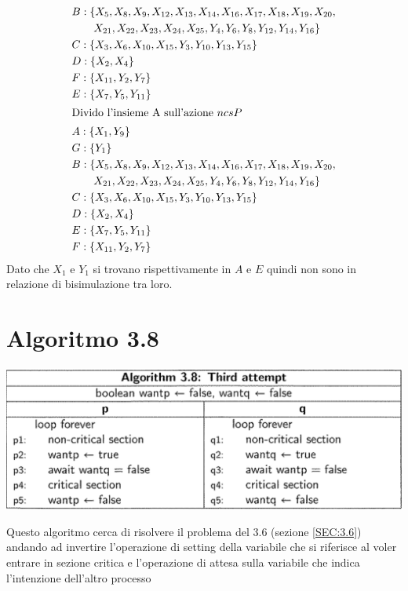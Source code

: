 \documentclass[a4paper]{article}
\begin{document}
\begin{align*}
	&B: \{X_5,X_8,X_9,X_{12},X_{13},X_{14},X_{16},X_{17},X_{18},X_{19},X_{20},\\& \qquad X_{21},X_{22},X_{23},X_{24},X_{25},Y_4,Y_6,Y_8,Y_{12},Y_{14},Y_{16}\}\\
	&C: \{X_3,X_6,X_{10},X_{15},Y_3,Y_{10},Y_{13},Y_{15} \}\\
	&D: \{X_2,X_4\}\\
	&F: \{X_{11},Y_2,Y_7\}\\
	&E: \{X_7,Y_5,Y_{11}\}\\
     \intertext{Divido l'insieme A sull'azione $ncsP$ }
	&A: \{X_1,Y_9\}\\
	&G: \{Y_1\}\\
	&B: \{X_5,X_8,X_9,X_{12},X_{13},X_{14},X_{16},X_{17},X_{18},X_{19},X_{20},\\& \qquad X_{21},X_{22},X_{23},X_{24},X_{25},Y_4,Y_6,Y_8,Y_{12},Y_{14},Y_{16}\}\\
	&C: \{X_3,X_6,X_{10},X_{15},Y_3,Y_{10},Y_{13},Y_{15} \}\\
	&D: \{X_2,X_4\}\\
	&E: \{X_7,Y_5,Y_{11}\}\\
	&F: \{X_{11},Y_2,Y_7\}\\

\end{align*}
Dato che $X_1$ e $Y_1$ si trovano rispettivamente in $A$ e $E$ quindi non sono in relazione di bisimulazione tra loro.
\newpage
\section{Algoritmo 3.8}
\label{SEC:3.8}
\begin{center}\includegraphics[width=1\textwidth]{3.8.png}\end{center}
Questo algoritmo cerca di risolvere il problema del 3.6 (sezione \ref{SEC:3.6}) andando ad invertire l'operazione di setting della variabile che si riferisce al voler entrare in sezione critica e l'operazione di attesa sulla variabile che indica l'intenzione dell'altro processo
\end{document}
